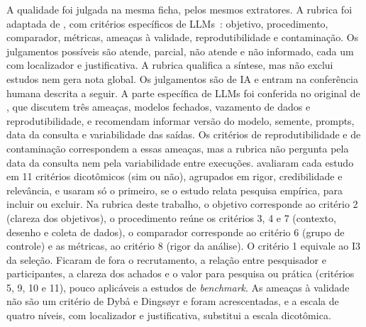 A qualidade foi julgada na mesma ficha, pelos mesmos extratores. A rubrica foi adaptada de
, com critérios específicos de LLMs~\citep{sallou2024breaking}: objetivo,
procedimento, comparador, métricas, ameaças à validade, reprodutibilidade e contaminação. Os julgamentos possíveis
são atende, parcial, não atende e não informado, cada um com localizador e justificativa. A rubrica qualifica a
síntese, mas não exclui estudos nem gera nota global. Os julgamentos são de IA e entram na conferência humana
descrita a seguir.
A parte específica de LLMs foi conferida no original de , que discutem três
ameaças, modelos fechados, vazamento de dados e reprodutibilidade, e recomendam informar versão do modelo, semente,
prompts, data da consulta e variabilidade das saídas. Os critérios de reprodutibilidade e de contaminação
correspondem a essas ameaças, mas a rubrica não pergunta pela data da consulta nem pela variabilidade entre
execuções.
 avaliaram cada estudo em 11 critérios dicotômicos (sim ou não), agrupados em
rigor, credibilidade e relevância, e usaram só o primeiro, se o estudo relata pesquisa empírica, para incluir ou
excluir. Na rubrica deste trabalho, o objetivo corresponde ao critério 2 (clareza dos objetivos), o procedimento
reúne os critérios 3, 4 e 7 (contexto, desenho e coleta de dados), o comparador corresponde ao critério 6 (grupo de
controle) e as métricas, ao critério 8 (rigor da análise). O critério 1 equivale ao I3 da seleção. Ficaram de fora
o recrutamento, a relação entre pesquisador e participantes, a clareza dos achados e o valor para pesquisa ou
prática (critérios 5, 9, 10 e 11), pouco aplicáveis a estudos de \textit{benchmark}. As ameaças à validade não são
um critério de Dybå e Dingsøyr e foram acrescentadas, e a escala de quatro níveis, com localizador e justificativa,
substitui a escala dicotômica.


